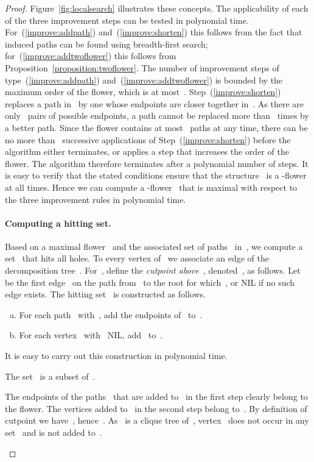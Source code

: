 \begin{proof}
Figure~\ref{fig:localsearch} illustrates these concepts. The applicability of each of the three improvement steps can be tested in polynomial time. For~(\ref{improve:addpath}) and~(\ref{improve:shorten}) this follows from the fact that induced paths can be found using breadth-first search; for~(\ref{improve:addtwoflower}) this follows from Proposition~\ref{proposition:twoflower}. The number of improvement steps of type~(\ref{improve:addpath}) and~(\ref{improve:addtwoflower}) is bounded by the maximum order of the flower, which is at most~. Step~(\ref{improve:shorten}) replaces a path in~ by one whose endpoints are closer together in~. As there are only~ pairs of possible endpoints, a path cannot be replaced more than~ times by a better path. Since the flower contains at most~ paths at any time, there can be no more than~ successive applications of Step~(\ref{improve:shorten}) before the algorithm either terminates, or applies a step that increases the order of the flower. The algorithm therefore terminates after a polynomial number of steps. It is easy to verify that the stated conditions ensure that the structure~ is a -flower at all times. Hence we can compute a -flower~ that is maximal with respect to the three improvement rules in polynomial time.

\paragraph{Computing a hitting set.} Based on a maximal flower~ and the associated set of paths~ in~, we compute a set~ that hits all holes. To every vertex of~ we associate an edge of the decomposition tree~. For~, define the \emph{cutpoint above~}, denoted~, as follows. Let~ be the first edge~ on the path from~ to the root for which~, or NIL if no such edge exists. The hitting set~ is constructed as follows.

\begin{enumerate}[(a)]
	\item For each path~ with~, add the endpoints of~ to~.\label{hittingset:endpoints}
	\item For each vertex~ with~ NIL, add~ to~.\label{hittingset:cutpoint}
\end{enumerate}

It is easy to carry out this construction in polynomial time.

\begin{claim} \label{claim:s:subset:flower}
The set~ is a subset of~.
\end{claim}
\begin{claimproof}
The endpoints of the paths~ that are added to~ in the first step clearly belong to the flower. The vertices added to~ in the second step belong to~. By definition of cutpoint we have~, hence~. As~ is a clique tree of~, vertex~ does not occur in any set~ and is not added to~.
\end{claimproof}


\end{proof}
